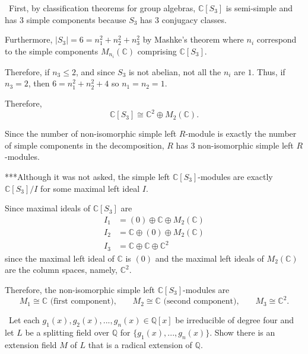 \documentclass[12pt]{AlgebraQual}
\begin{document}
\begin{solution}$\,$
First, by classification theorems for group algebras, $\mathbb{C}[S_3]$ is semi-simple and has $3$ simple components because $S_3$ has $3$ conjugacy classes.

Furthermore, $|S_3|=6=n_1^2+n_2^2+n_3^2$ by Mashke's theorem where $n_i$ correspond to the simple components $M_{n_i}(\mathbb{C})$ comprising $\mathbb{C}[S_3]$.

Therefore, if $n_3\le 2$, and since $S_3$ is not abelian, not all the $n_i$ are $1$. Thus, if $n_3=2$, then $6=n_1^2+n_2^2+4$ so $n_1=n_2=1$.

Therefore, $$\mathbb{C}[S_3]\cong\mathbb{C}^2\oplus M_2(\mathbb{C}).$$

Since the number of non-isomorphic simple left $R$-module is exactly the number of simple components in the decomposition, $R$ has $3$ non-isomorphic simple left $R$-modules.

\begin{mybox}
***Although it was not asked, the simple left $\mathbb{C}[S_3]$-modules are exactly $\mathbb{C}[S_3]/I$ for some maximal left ideal $I.$

Since maximal ideals of $\mathbb{C}[S_3]$ are \begin{align*}
    I_1&=(0)\oplus\mathbb{C}\oplus M_2(\mathbb{C})\\
    I_2&=\mathbb{C}\oplus(0)\oplus M_2(\mathbb{C})\\
    I_3&=\mathbb{C}\oplus\mathbb{C}\oplus\mathbb{C}^2
\end{align*} since the maximal left ideal of $\mathbb{C}$ is $(0)$ and the maximal left ideals of $M_2(\mathbb{C})$ are the column spaces, namely, $\mathbb{C}^2$.

Therefore, the non-isomorphic simple left $\mathbb{C}[S_3]$-modules are $$M_1\cong\mathbb{C}\text{ (first component),}\qquad M_2\cong\mathbb{C}\text{ (second component),}\qquad M_3\cong\mathbb{C}^2.$$
\end{mybox}

\end{solution}
\newpage



\begin{problem} $\,$
Let each $g_1(x),g_2(x),...,g_n(x)\in\mathbb{Q}[x]$ be irreducible of degree four and let $L$ be a splitting field over $\mathbb{Q}$ for $\{g_1(x),...,g_n(x)\}.$ Show there is an extension field $M$ of $L$ that is a radical extension of $\mathbb{Q}.$
\end{problem}
\end{document}
